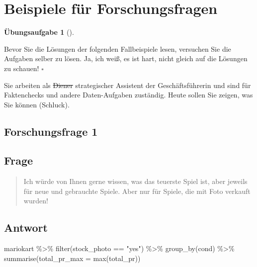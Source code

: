 \documentclass[
  a4paper,
  DIV=11]{scrreprt}
\newenvironment{Shaded}{\begin{snugshade}}{\end{snugshade}}
\newcommand{\AttributeTok}[1]{\textcolor[rgb]{0.40,0.45,0.13}{#1}}
\newcommand{\FunctionTok}[1]{\textcolor[rgb]{0.28,0.35,0.67}{#1}}
\newcommand{\NormalTok}[1]{\textcolor[rgb]{0.00,0.23,0.31}{#1}}
\newcommand{\SpecialCharTok}[1]{\textcolor[rgb]{0.37,0.37,0.37}{#1}}
\newcommand{\StringTok}[1]{\textcolor[rgb]{0.13,0.47,0.30}{#1}}
\theoremstyle{definition}
\newtheorem{exercise}{Übungsaufgabe}[chapter]
\theoremstyle{definition}
\theoremstyle{definition}
\theoremstyle{remark}
\begin{document}
\section{Beispiele für
Forschungsfragen}\label{beispiele-fuxfcr-forschungsfragen}

\begin{exercise}[]\protect\hypertarget{exr-fallbsps}{}\label{exr-fallbsps}

Bevor Sie die Lösungen der folgenden Fallbeispiele lesen, versuchen Sie
die Aufgaben selber zu lösen. Ja, ich weiß, es ist hart, nicht gleich
auf die Lösungen zu schauen! \(\square\)

\end{exercise}

Sie arbeiten als \st{Diener} strategischer Assistent der
Geschäftsführerin und sind für Faktenchecks und andere Daten-Aufgaben
zuständig. Heute sollen Sie zeigen, was Sie können (Schluck).

\subsection{Forschungsfrage 1}\label{forschungsfrage-1-1}

\subsection{Frage}

\begin{quote}
{} Ich würde von Ihnen gerne wissen, was das teuerste Spiel
ist, aber jeweils für neue und gebrauchte Spiele. Aber nur für Spiele,
die mit Foto verkauft wurden!
\end{quote}

\subsection{Antwort}

\begin{Shaded}
\begin{Highlighting}[]
\NormalTok{mariokart }\SpecialCharTok{\%\textgreater{}\%} 
  \FunctionTok{filter}\NormalTok{(stock\_photo }\SpecialCharTok{==} \StringTok{"yes"}\NormalTok{) }\SpecialCharTok{\%\textgreater{}\%} 
  \FunctionTok{group\_by}\NormalTok{(cond) }\SpecialCharTok{\%\textgreater{}\%} 
  \FunctionTok{summarise}\NormalTok{(}\AttributeTok{total\_pr\_max =} \FunctionTok{max}\NormalTok{(total\_pr))}
\end{Highlighting}
\end{Shaded}
\end{document}
